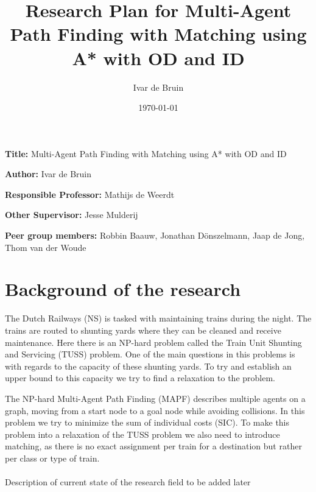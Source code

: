 \documentclass[english]{article}
\title{Research Plan for Multi-Agent Path Finding with Matching using A* with OD and ID}
\author{Ivar de Bruin}
\date{\today}
\newcommand{\namelistlabel}[1]{\mbox{#1}\hfil}
\newenvironment{namelist}[1]{%
\begin{list}{}
    {
        \let\makelabel\namelistlabel
        \settowidth{\labelwidth}{#1}
        \setlength{\leftmargin}{1.1\labelwidth}
    }
  }{%
\end{list}}
\begin{document}
\maketitle

\begin{namelist}{xxxxxxxxxxxxxxxxxxxxxxxxxxxxxxxxxxxxxxx}
\item[{\bf Title:}]
	Multi-Agent Path Finding with Matching using A* with OD and ID
\item[{\bf Author:}]
	Ivar de Bruin
\item[{\bf Responsible Professor:}]
	Mathijs de Weerdt
\item[{\bf Other Supervisor:}]
	Jesse Mulderij
\item[{\bf Peer group members:}]
	Robbin Baauw, Jonathan D\"onszelmann, Jaap de Jong, Thom van der Woude
\end{namelist}

\tableofcontents

\section{Background of the research}
The Dutch Railways (NS) is tasked with maintaining trains during the night. 
The trains are routed to shunting yards where they can be cleaned and receive maintenance. 
Here there is an NP-hard problem called the Train Unit Shunting and Servicing (TUSS) problem. 
One of the main questions in this problems is with regards to the capacity of these shunting yards. 
To try and establish an upper bound to this capacity we try to find a relaxation to the problem. 

The NP-hard Multi-Agent Path Finding (MAPF) describes multiple agents on a graph, moving from a start node to a goal node while avoiding collisions. 
In this problem we try to minimize the sum of individual costs (SIC).
To make this problem into a relaxation of the TUSS problem we also need to introduce matching, as there is no exact assignment per train for a destination but rather per class or type of train.
\\\\%
{\color{red}Description of current state of the research field to be added later}
\end{document}
